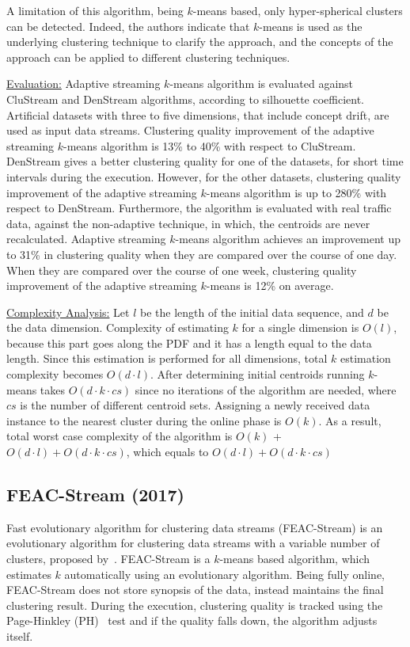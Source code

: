 \documentclass[smallcondensed]{svjour3}     %
\begin{document}
A limitation of this algorithm, being $k$-means based, only hyper-spherical clusters can be detected. Indeed, the authors indicate that $k$-means is used as the underlying clustering technique to clarify the approach, and the concepts of the approach can be applied to different clustering techniques.

\underline{Evaluation:} Adaptive streaming $k$-means algorithm is evaluated against CluStream and DenStream algorithms, according to silhouette coefficient. Artificial datasets with three to five dimensions, that include concept drift, are used as input data streams. Clustering quality improvement of the adaptive streaming $k$-means algorithm is 13\% to 40\% with respect to CluStream. DenStream gives a better clustering quality for one of the datasets, for short time intervals during the execution. However, for the other datasets, clustering quality improvement of the adaptive streaming $k$-means algorithm is up to 280\% with respect to DenStream. Furthermore, the algorithm is evaluated with real traffic data, against the non-adaptive technique, in which, the centroids are never recalculated. Adaptive streaming $k$-means algorithm achieves an improvement up to 31\% in clustering quality when they are compared over the course of one day. When they are compared over the course of one week, clustering quality improvement of the adaptive streaming $k$-means is 12\% on average.

\underline{Complexity Analysis:} Let $l$ be the length of the initial data sequence, and $d$ be the data dimension. Complexity of estimating $k$ for a single dimension is $O(l)$, because this part goes along the PDF and it has a length equal to the data length. Since this estimation is performed for all dimensions, total $k$ estimation complexity becomes $O(d \cdot l)$. After determining initial centroids running $k$-means takes $O(d \cdot k \cdot cs)$ since no iterations of the algorithm are needed, where $cs$ is the number of different centroid sets. Assigning a newly received data instance to the nearest cluster during the online phase is $O(k)$. As a result, total worst case complexity of the algorithm is $O(k)$ + $O(d \cdot l) + O(d \cdot k \cdot cs)$, which equals to $O(d \cdot l)+ O(d \cdot k \cdot cs)$

\subsection{FEAC-Stream (2017)}
Fast evolutionary algorithm for clustering data streams (FEAC-Stream) is an evolutionary algorithm for clustering data streams with a variable number of clusters, proposed by~\citet{Silva:2017:FEAC-Stream}. FEAC-Stream is a $k$-means based algorithm, which estimates $k$ automatically using an evolutionary algorithm. Being fully online, FEAC-Stream does not store synopsis of the data, instead maintains the final clustering result. During the execution, clustering quality is tracked using the Page-Hinkley (PH)~\citep{Page-Hinckley} test and if the quality falls down, the algorithm adjusts itself.
\end{document}
